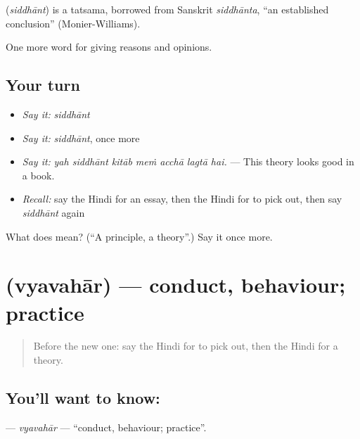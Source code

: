 \begin{cousinweb}
\textbf{} (\emph{siddhānt}) is a tatsama, borrowed from Sanskrit \emph{siddhānta}, \textquotedblleft{}an established conclusion\textquotedblright{} (Monier-Williams).
\end{cousinweb}

\begin{grammarlens}[title={What you've built}]
One more word for giving reasons and opinions.
\end{grammarlens}

\subsection*{Your turn}
\begin{itemize}
\raggedright
  \item \emph{Say it:} \emph{siddhānt}
  \item \emph{Say it:} \emph{siddhānt}, once more
  \item \emph{Say it:} \emph{yah siddhānt kitāb meṁ acchā lagtā hai.} — This theory looks good in a book.
  \item \emph{Recall:} say the Hindi for an essay, then the Hindi for to pick out, then say \emph{siddhānt} again
\end{itemize}

\begin{tcolorbox}[breakable,colback=teal!4,colframe=teal!35!black,title={Before you move on}]
What does  mean? (\textquotedblleft{}A principle, a theory\textquotedblright{}.) Say it once more.
\end{tcolorbox}
\section[\texorpdfstring{\hi{व्यवहार} (vyavahār)}{व्यवहार (vyavahār)}]{ (vyavahār) — conduct, behaviour; practice}

\label{lesson:HI-C365-vyavahar}



\begin{quote}
Before the new one: say the Hindi for to pick out, then the Hindi for a theory.
\end{quote}

\subsection*{You'll want to know: }
\textbf{} — \emph{vyavahār} — \textquotedblleft{}conduct, behaviour; practice\textquotedblright{}.

